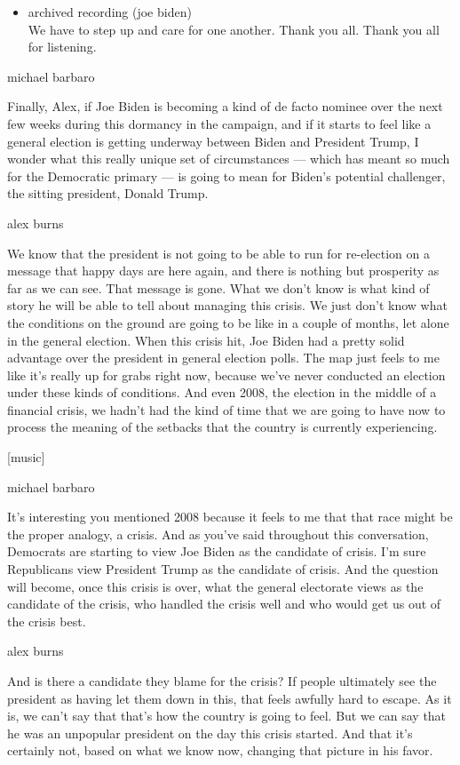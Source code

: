 \begin{itemize}
\tightlist
\item
  archived recording (joe biden)\\
  We have to step up and care for one another. Thank you all. Thank you
  all for listening.
\end{itemize}

michael barbaro

Finally, Alex, if Joe Biden is becoming a kind of de facto nominee over
the next few weeks during this dormancy in the campaign, and if it
starts to feel like a general election is getting underway between Biden
and President Trump, I wonder what this really unique set of
circumstances --- which has meant so much for the Democratic primary ---
is going to mean for Biden's potential challenger, the sitting
president, Donald Trump.

alex burns

We know that the president is not going to be able to run for
re-election on a message that happy days are here again, and there is
nothing but prosperity as far as we can see. That message is gone. What
we don't know is what kind of story he will be able to tell about
managing this crisis. We just don't know what the conditions on the
ground are going to be like in a couple of months, let alone in the
general election. When this crisis hit, Joe Biden had a pretty solid
advantage over the president in general election polls. The map just
feels to me like it's really up for grabs right now, because we've never
conducted an election under these kinds of conditions. And even 2008,
the election in the middle of a financial crisis, we hadn't had the kind
of time that we are going to have now to process the meaning of the
setbacks that the country is currently experiencing.

{[}music{]}

michael barbaro

It's interesting you mentioned 2008 because it feels to me that that
race might be the proper analogy, a crisis. And as you've said
throughout this conversation, Democrats are starting to view Joe Biden
as the candidate of crisis. I'm sure Republicans view President Trump as
the candidate of crisis. And the question will become, once this crisis
is over, what the general electorate views as the candidate of the
crisis, who handled the crisis well and who would get us out of the
crisis best.

alex burns

And is there a candidate they blame for the crisis? If people ultimately
see the president as having let them down in this, that feels awfully
hard to escape. As it is, we can't say that that's how the country is
going to feel. But we can say that he was an unpopular president on the
day this crisis started. And that it's certainly not, based on what we
know now, changing that picture in his favor.

